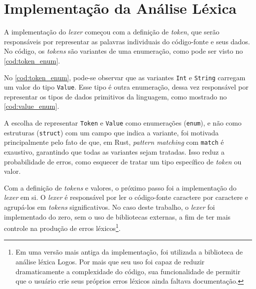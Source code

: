 \section{Implementação da Análise Léxica} \label{sec:analise_lexica}

A implementação do \textit{lexer} começou com a definição de \textit{token}, que serão responsáveis por representar as palavras individuais do código-fonte e seus dados. No código, os \textit{tokens} são variantes de uma enumeração, como pode ser visto no \autoref{cod:token_enum}.

\codigoRust

\vspace{-1em}

No \autoref{cod:token_enum}, pode-se observar que as variantes \texttt{Int} e \texttt{String} carregam um valor do tipo \texttt{Value}. Esse tipo é outra enumeração, dessa vez responsável por representar os tipos de dados primitivos da linguagem, como mostrado no \autoref{cod:value_enum}.

\codigoRust

\vspace{-1em}

A escolha de representar \texttt{Token} e \texttt{Value} como enumerações (\texttt{enum}), e não como estruturas (\texttt{struct}) com um campo que indica a variante, foi motivada principalmente pelo fato de que, em Rust, \textit{pattern matching} com \texttt{match} é exaustivo, garantindo que todas as variantes sejam tratadas. Isso reduz a probabilidade de erros, como esquecer de tratar um tipo específico de \textit{token} ou valor.

Com a definição de \textit{tokens} e valores, o próximo passo foi a implementação do \textit{lexer} em si. O \textit{lexer} é responsável por ler o código-fonte caractere por caractere e agrupá-los em \textit{tokens} significativos. No caso deste trabalho, o \textit{lexer} foi implementado do zero, sem o uso de bibliotecas externas, a fim de ter mais controle na produção de erros léxicos\footnote{Em uma versão mais antiga da implementação, foi utilizada a biblioteca de análise léxica Logos. Por mais que seu uso foi capaz de reduzir dramaticamente a complexidade do código, sua funcionalidade de permitir que o usuário crie seus próprios erros léxicos ainda faltava documentação.}.

